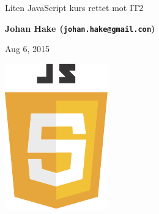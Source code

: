 \documentclass[%
oneside,                 %
final,                   %
12pt]{article}
\begin{document}






\thispagestyle{empty}

\begin{center}
{\LARGE\bf
\begin{spacing}{1.25}
Liten JavaScript kurs rettet mot IT2
\end{spacing}
}
\end{center}


\begin{center}
{\bf Johan Hake${}^{}$ (\texttt{johan.hake@gmail.com})} \\ [0mm]
\end{center}

\begin{center}
\end{center}
    

\begin{center} %
Aug 6, 2015
\end{center}

\vspace{1cm}





\centerline{\includegraphics[width=0.5\linewidth]{figures/javascript-seeklogo.pdf}}
\end{document}
